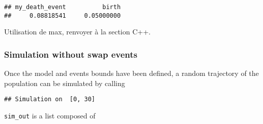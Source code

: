 \begin{Shaded}
\begin{Highlighting}[]
\StringTok{ } 
\StringTok{ }\NormalTok{(}\NormalTok{ =}\StringTok{ }\OperatorTok{*}\NormalTok{(}\OperatorTok{*}
                  \NormalTok{ =}\StringTok{ }\OperatorTok{$}

\end{Highlighting}
\end{Shaded}

\begin{verbatim}
## my_death_event          birth 
##     0.08818541     0.05000000
\end{verbatim}

{ Utilisation de max, renvoyer à la section C++. }

\hypertarget{Simulation1}{%
\subsubsection{Simulation without swap events}\label{Simulation1}}

Once the model and events bounds have been defined, a random trajectory of the population can be simulated by calling

\begin{Shaded}
\begin{Highlighting}[]
\StringTok{ }
                   \NormalTok{)}
\end{Highlighting}
\end{Shaded}

\begin{verbatim}
## Simulation on  [0, 30]
\end{verbatim}

\begin{Shaded}
\begin{Highlighting}[]
\end{Highlighting}
\end{Shaded}

\texttt{sim\_out} is a list composed of

